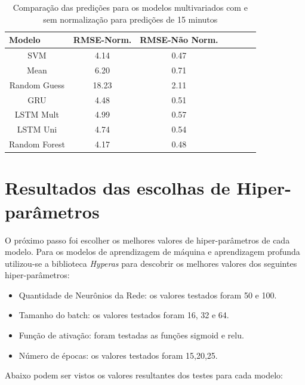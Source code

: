 \begin{table}[htbp]
    \caption{Comparação das predições para os modelos multivariados com e sem normalização para predições de 15 minutos}
    \label{table:comp_rmse_multi_15}
    \begin{center}
    \begin{tabular}{ccccccc}
    \hline
    \multicolumn{1}{l}{\textbf{Modelo}} & \multicolumn{1}{l}{\textbf{RMSE-Norm.}} & \multicolumn{1}{l}{\textbf{RMSE-Não Norm.}}\\
    \hline
    SVM & 4.14 & 0.47  \\
    Mean & 6.20 & 0.71  \\
    Random Guess & 18.23 & 2.11\\
    GRU & 4.48 & 0.51  \\ 
    LSTM Mult & 4.99 &  0.57  \\ 
    LSTM Uni & 4.74 &  0.54  \\ 
    Random Forest & 4.17 & 0.48 \\
    \hline
    \end{tabular}
    \end{center}
\end{table}

\section{Resultados das escolhas de Hiper-parâmetros}

O próximo passo foi escolher os melhores valores de hiper-parâmetros de cada modelo. Para os modelos de aprendizagem de máquina e aprendizagem profunda utilizou-se a biblioteca \textit{Hyperas} para descobrir os melhores valores dos seguintes hiper-parâmetros:

\begin{itemize}
	\item Quantidade de Neurônios da Rede: os valores testados foram 50 e 100.
	\item Tamanho do batch: os valores testados foram 16, 32 e 64.
	\item Função de ativação: foram testadas as funções sigmoid e relu.
	\item Número de épocas: os valores testados foram 15,20,25.
\end{itemize}

Abaixo podem ser vistos os valores resultantes dos testes para cada modelo:

